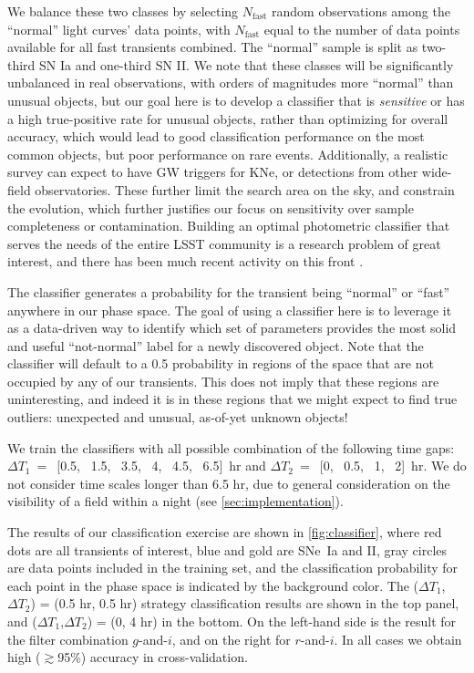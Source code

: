 \documentclass[letterpaper,longauthor,trackchanges,twocolumn,onecolappendix,sort&compress]{aastex62}
\newcommand{\dtone}{\ensuremath{\Delta T_1}}
\newcommand{\dttwo}{\ensuremath{\Delta T_2}}
\begin{document}
We balance these two classes by selecting  $N_\mathrm{fast}$ random observations among the ``normal'' light curves' data points, with $N_\mathrm{fast}$ equal to the number of data points available for all fast transients combined. The ``normal'' sample is split as two-third SN Ia and one-third SN II.  We note that these classes will be significantly unbalanced in real observations, with orders of magnitudes more ``normal'' than unusual objects, but our goal here is to develop a classifier that is \emph{sensitive} or has a high true-positive rate for unusual objects, rather than optimizing for overall accuracy, which would lead to good classification performance on the most common objects, but poor performance on rare events. Additionally, a realistic survey can expect to have GW triggers for KNe, or detections from other wide-field observatories. These further limit the search area on the sky, and constrain the evolution, which further justifies our focus on sensitivity over sample completeness or contamination. Building an optimal photometric classifier that serves the needs of the entire LSST community is a research problem of great interest, and there has been much recent activity on this front \citep[e.g.][]{plasticc}.

The classifier generates a probability for the transient being ``normal'' or ``fast'' anywhere in our phase space.  The goal of using a classifier here is to leverage it as a data-driven way to identify which set of parameters provides the most solid and useful ``not-normal'' label for a newly discovered object. Note that the classifier will default to a 0.5 probability in regions of the space that are not occupied by any of our transients. This does not imply that these regions are uninteresting, and indeed it is in these regions that we might expect to find true outliers: unexpected and unusual, as-of-yet unknown objects!

We train the classifiers with all possible combination of the following time gaps: 
$\dtone~=$~[0.5, ~1.5, ~3.5, ~4, ~4.5, ~6.5]~hr and 
$\dttwo~=$~[0, ~0.5, ~1, ~2]~hr. We do not consider time scales longer than 6.5 hr, due to general consideration on the visibility of a field within a night (see \autoref{sec:implementation}).

The results of our classification exercise are shown in \autoref{fig:classifier}, where red dots are all transients of interest, blue and gold are SNe~Ia and II, gray circles are data points included in the training set, and the classification probability for each point in the phase space is indicated by the background color. The (\dtone,\dttwo) = (0.5 hr, 0.5 hr) strategy classification results are shown in the top panel, and (\dtone,\dttwo) = (0, 4 hr) in the bottom.
On the left-hand side is the result for the filter combination $g$-and-$i$, and on the right for $r$-and-$i$. In all cases we obtain high ($\gtrsim$95\%) accuracy in cross-validation. 
\end{document}
